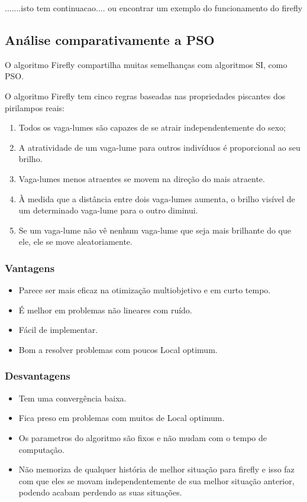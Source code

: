 \documentclass[10pt]{article}
\begin{document}
 .......isto tem continuacao....
    ou encontrar um exemplo do funcionamento do firefly
    
    

 \subsection{Análise comparativamente a PSO}
O algoritmo Firefly compartilha muitas semelhanças com 
algoritmos SI, como PSO.

O algoritmo Firefly tem cinco regras baseadas nas propriedades 
piscantes dos pirilampos reais:
\begin{enumerate}
  \item Todos os vaga-lumes são capazes de se atrair independentemente do sexo; 
  \item A atratividade de um vaga-lume para outros indivíduos é proporcional ao seu brilho. 
  \item Vaga-lumes menos atraentes se movem na direção do mais atraente. 
  \item À medida que a distância entre dois vaga-lumes aumenta, o brilho visível de um determinado vaga-lume para o outro diminui. 
  \item Se um vaga-lume não vê nenhum vaga-lume que seja mais brilhante do que ele, ele se move aleatoriamente. 
\end{enumerate}
\subsubsection{Vantagens }\label{sec:vantagens}
\begin{itemize}
  \item Parece ser mais eficaz na otimização multiobjetivo e em curto tempo.
  \item É melhor em problemas não lineares com ruído.
  \item Fácil de implementar.
  \item Bom a resolver problemas com poucos Local optimum.
\end{itemize}

\subsubsection{Desvantagens}\label{sec:desvantagens}
\begin{itemize}
  \item Tem uma convergência baixa.
  \item Fica preso em problemas com muitos de Local optimum.
  \item Os parametros do algoritmo são fixos e não mudam com o tempo de computação.
  \item Não memoriza de qualquer história de melhor
  situação para firefly e isso faz com que eles se movam
  independentemente de sua melhor situação anterior, podendo
  acabam perdendo as suas situações.
\end{itemize}
\newpage
\end{document}
